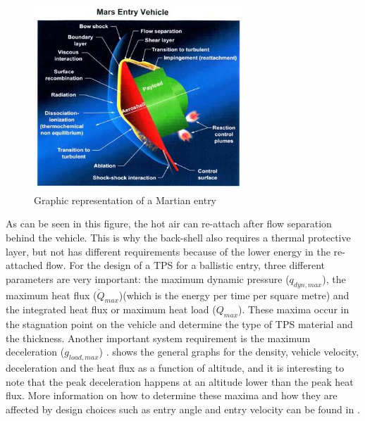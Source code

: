 \begin{figure}[!ht]
\centering
\includegraphics[width=0.7\textwidth]{figures/entry_descent/marsev_mooij2013entry.jpg}
\caption{Graphic representation of a Martian entry \cite{mooij2013entry}}
\label{fig:marsev_mooij2013entry}
\end{figure}

As can be seen in this figure, the hot air can re-attach after flow separation behind the vehicle. This is why the back-shell also requires a thermal protective layer, but not has different requirements because of the lower energy in the re-attached flow. For the design of a \acs{TPS} for a ballistic entry, three different parameters are very important: the maximum dynamic pressure ($q_{dyn,max}$), the maximum heat flux ($\dot{Q}_{max}$)(which is the energy per time per square metre) and the integrated heat flux or maximum heat load ($Q_{max}$). These maxima occur in the stagnation point on the vehicle and determine the type of \acs{TPS} material and the thickness. Another important system requirement is the maximum deceleration ($g_{load,max}$) \cite{mooij2013entry}.  shows the general graphs for the density, vehicle velocity, deceleration and the heat flux as a function of altitude, and it is interesting to note that the peak deceleration happens at an altitude lower than the peak heat flux. More information on how to determine these maxima and how they are affected by design choices such as entry angle and entry velocity can be found in \cite{mooij2013entry}.  



